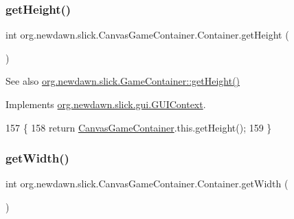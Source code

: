 \subsubsection{\texorpdfstring{get\+Height()}{getHeight()}}
{\footnotesize\ttfamily int org.\+newdawn.\+slick.\+Canvas\+Game\+Container.\+Container.\+get\+Height (\begin{DoxyParamCaption}{ }\end{DoxyParamCaption})\hspace{0.3cm}{\ttfamily [inline]}}

\begin{DoxySeeAlso}{See also}
\mbox{\hyperlink{classorg_1_1newdawn_1_1slick_1_1_game_container_a7eff88473fe5715fdfc2f92e8cb48521}{org.\+newdawn.\+slick.\+Game\+Container\+::get\+Height()}} 
\end{DoxySeeAlso}


Implements \mbox{\hyperlink{interfaceorg_1_1newdawn_1_1slick_1_1gui_1_1_g_u_i_context_a6370bee8e5833f95e27724b6a533c211}{org.\+newdawn.\+slick.\+gui.\+G\+U\+I\+Context}}.


\begin{DoxyCode}
157                                \{
158             \textcolor{keywordflow}{return} \mbox{\hyperlink{classorg_1_1newdawn_1_1slick_1_1_canvas_game_container_a078feee2c69d77cabd1f09b87d055923}{CanvasGameContainer}}.this.getHeight();
159         \}
\end{DoxyCode}
\mbox{\label{classorg_1_1newdawn_1_1slick_1_1_canvas_game_container_1_1_container_af5d516263e9340c38d73937f4842de33}} 
\subsubsection{\texorpdfstring{get\+Width()}{getWidth()}}
{\footnotesize\ttfamily int org.\+newdawn.\+slick.\+Canvas\+Game\+Container.\+Container.\+get\+Width (\begin{DoxyParamCaption}{ }\end{DoxyParamCaption})\hspace{0.3cm}{\ttfamily [inline]}}

